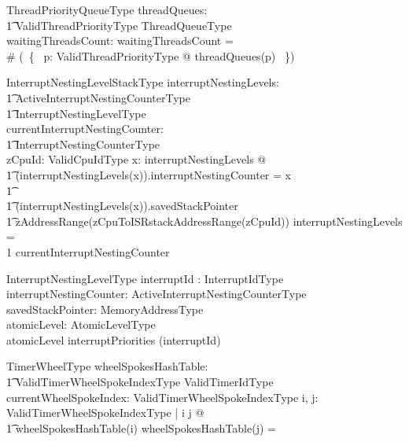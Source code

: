 \documentclass[11pt,letterpaper,twoside,openany]{book}
\begin{document}
\begin{schema}{ThreadPriorityQueueType}
    threadQueues: \\
    \t1 ValidThreadPriorityType \inj ThreadQueueType \\
    waitingThreadsCount: \nat
\where
   waitingThreadsCount = \\
   \# (\bigcup ~\{~ p: ValidThreadPriorityType @ threadQueues(p) ~\})
\end{schema}

\begin{schema}{InterruptNestingLevelStackType}
       interruptNestingLevels: \\
    \t1 ActiveInterruptNestingCounterType \inj \\
    \t1 InterruptNestingLevelType \\
    currentInterruptNestingCounter: \\
    \t1 InterruptNestingCounterType \\
    zCpuId: ValidCpuIdType
\where
   \forall x: \dom interruptNestingLevels @ \\
\t1   (interruptNestingLevels(x)).interruptNestingCounter = x \\
\t1   \land \\
\t1   (interruptNestingLevels(x)).savedStackPointer \in \\
\t1        zAddressRange(zCpuToISRstackAddressRange(zCpuId))
\also
   \dom interruptNestingLevels = \\
   1 \upto currentInterruptNestingCounter
\end{schema}

\begin{schema}{InterruptNestingLevelType}
   interruptId : InterruptIdType \\
   interruptNestingCounter: ActiveInterruptNestingCounterType \\
   savedStackPointer: MemoryAddressType \\
   atomicLevel: AtomicLevelType \\
\where
   atomicLevel \leq interruptPriorities (interruptId)
\also

\end{schema}

\begin{schema}{TimerWheelType}
   wheelSpokesHashTable: \\
   \t1 ValidTimerWheelSpokeIndexType \fun \finset ValidTimerIdType \\
   currentWheelSpokeIndex: ValidTimerWheelSpokeIndexType
\where
    \forall i, j: ValidTimerWheelSpokeIndexType | i \neq j @ \\
    \t1 wheelSpokesHashTable(i) \cap wheelSpokesHashTable(j) = \emptyset
\end{schema}
\end{document}
